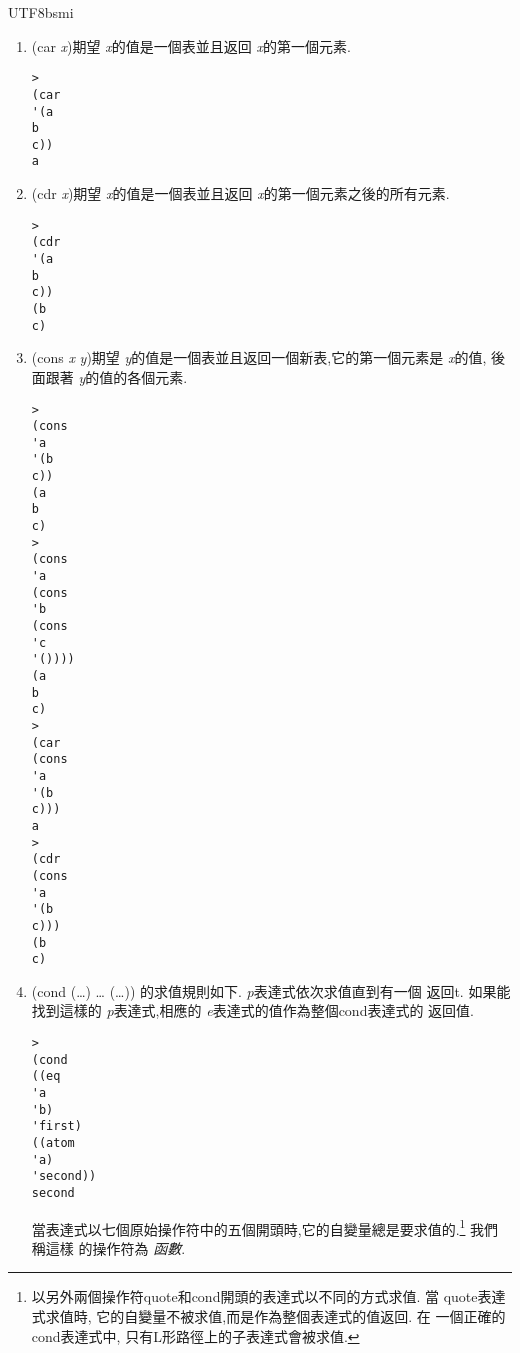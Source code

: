 \documentclass[12pt,a4]{article}
\begin{document}
\begin{CJK}{UTF8}{bsmi}
\begin{enumerate}
否則返回(). 
\begin{verbatim} 
> 
(eq 
'a 
'a) 
t 
> 
(eq 
'a 
'b) 
() 
> 
(eq 
'() 
'()) 
t 
\end{verbatim} 
\item 
(car 
{\it 
x})期望{\it 
x}的值是一個表並且返回{\it 
x}的第一個元素. 
\begin{verbatim} 
> 
(car 
'(a 
b 
c)) 
a 
\end{verbatim} 
\item 
(cdr 
{\it 
x})期望{\it 
x}的值是一個表並且返回{\it 
x}的第一個元素之後的所有元素. 
\begin{verbatim} 
> 
(cdr 
'(a 
b 
c)) 
(b 
c) 
\end{verbatim} 
\item 
(cons 
{\it 
x} 
{\it 
y})期望{\it 
y}的值是一個表並且返回一個新表,它的第一個元素是{\it 
x}的值, 
後 
面跟著{\it 
y}的值的各個元素. 
\begin{verbatim} 
> 
(cons 
'a 
'(b 
c)) 
(a 
b 
c) 
> 
(cons 
'a 
(cons 
'b 
(cons 
'c 
'()))) 
(a 
b 
c) 
> 
(car 
(cons 
'a 
'(b 
c))) 
a 
> 
(cdr 
(cons 
'a 
'(b 
c))) 
(b 
c) 
\end{verbatim} 
\item 
(cond 
(\pone\dots\eone) 
\dots 
(\pn\dots\en)) 
的求值規則如下. 
{\it 
p}表達式依次求值直到有一個 
返回t. 
如果能找到這樣的{\it 
p}表達式,相應的{\it 
e}表達式的值作為整個cond表達式的 
返回值. 
\begin{verbatim} 
> 
(cond 
((eq 
'a 
'b) 
'first) 
((atom 
'a) 
'second)) 
second 
\end{verbatim} 
當表達式以七個原始操作符中的五個開頭時,它的自變量總是要求值的.\footnote{以另外兩個操作符quote和cond開頭的表達式以不同的方式求值. 
當 
quote表達式求值時, 
它的自變量不被求值,而是作為整個表達式的值返回. 
在 
一個正確的cond表達式中, 
只有L形路徑上的子表達式會被求值.} 
我們稱這樣 
的操作符為{\em 
函數}. 
\end{enumerate} 

\end{CJK}
\end{document}
